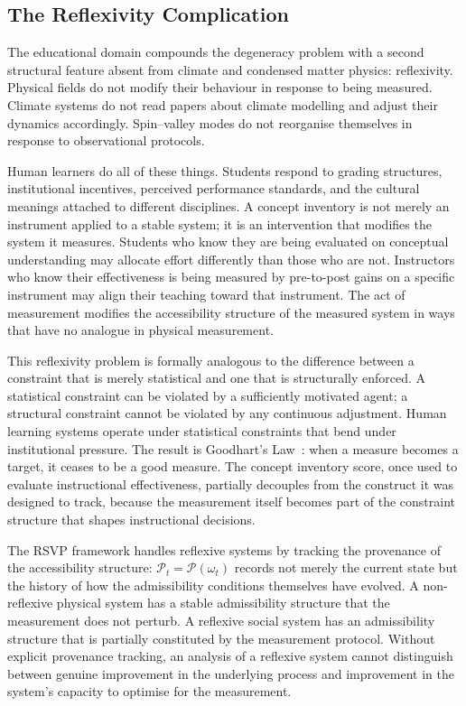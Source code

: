 \documentclass[11pt,a4paper]{article}
\theoremstyle{plain}
\theoremstyle{definition}
\theoremstyle{remark}
\newcommand{\Pp}{\mathcal{P}}
\begin{document}
\subsection{The Reflexivity Complication}

The educational domain compounds the degeneracy problem with a second
structural feature absent from climate and condensed matter physics: reflexivity.
Physical fields do not modify their behaviour in response to being measured.
Climate systems do not read papers about climate modelling and adjust their
dynamics accordingly. Spin--valley modes do not reorganise themselves in
response to observational protocols.

Human learners do all of these things. Students respond to grading structures,
institutional incentives, perceived performance standards, and the cultural
meanings attached to different disciplines. A concept inventory is not merely
an instrument applied to a stable system; it is an intervention that modifies
the system it measures. Students who know they are being evaluated on
conceptual understanding may allocate effort differently than those who are
not. Instructors who know their effectiveness is being measured by pre-to-post
gains on a specific instrument may align their teaching toward that instrument.
The act of measurement modifies the accessibility structure of the measured
system in ways that have no analogue in physical measurement.

This reflexivity problem is formally analogous to the difference between
a constraint that is merely statistical and one that is structurally enforced.
A statistical constraint can be violated by a sufficiently motivated agent;
a structural constraint cannot be violated by any continuous adjustment. Human
learning systems operate under statistical constraints that bend under
institutional pressure. The result is Goodhart's Law~\cite{Campbell1979}:
when a measure becomes a target, it ceases to be a good measure. The
concept inventory score, once used to evaluate instructional effectiveness,
partially decouples from the construct it was designed to track, because the
measurement itself becomes part of the constraint structure that shapes
instructional decisions.

The RSVP framework handles reflexive systems by tracking the provenance
of the accessibility structure: $\Pp_t = \Pp(\omega_t)$ records not merely
the current state but the history of how the admissibility conditions
themselves have evolved. A non-reflexive physical system has a stable
admissibility structure that the measurement does not perturb. A reflexive
social system has an admissibility structure that is partially constituted
by the measurement protocol. Without explicit provenance tracking, an
analysis of a reflexive system cannot distinguish between genuine improvement
in the underlying process and improvement in the system's capacity to optimise
for the measurement.
\end{document}
